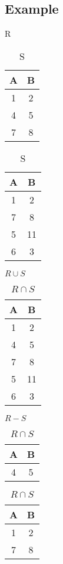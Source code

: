 \documentclass[twoside]{article}
\begin{document}
\subsection*{Example}
\begin{table}[!htb]
    \begin{minipage}{.5\linewidth}
      \caption{R}
      \centering
        \begin{tabular}{c|c}
            A & B \\
            \hline
            1 & 2 \\
            4 & 5 \\
            7 & 8 \\
        \end{tabular}
    \end{minipage}
    \begin{minipage}{.3\linewidth}
      \centering
        \caption{S}
        \begin{tabular}{c|c}
            A & B \\
            \hline
            1 & 2 \\
            7 & 8 \\
            5 & 11 \\
            6 & 3 \\
        \end{tabular}
    \end{minipage} 
\end{table}
\begin{table}[!htb]
    \begin{minipage}{.26\linewidth}
      \caption{$R \cup S$}
      \centering
        \begin{tabular}{c|c}
            A & B \\
            \hline
            1 & 2 \\
            4 & 5 \\
            7 & 8 \\
            5 & 11 \\
            6 & 3 \\
        \end{tabular}
    \end{minipage}
    \begin{minipage}{.4\linewidth}
      \centering
        \caption{$R - S$}
        \begin{tabular}{c|c}
            A & B \\
            \hline
            4 & 5 \\
        \end{tabular}
    \end{minipage} 
    \begin{minipage}{.3\linewidth}
        \centering
          \caption{$R \cap S$}
          \begin{tabular}{c|c}
                A & B \\
                \hline
                1 & 2 \\
                7 & 8 \\
          \end{tabular}
      \end{minipage} 
\end{table}
\end{document}
